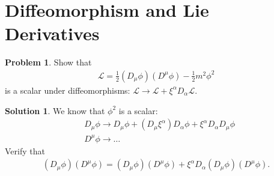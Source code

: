 \documentclass{book}
\numberwithin{equation}{section}
\theoremstyle{definition}
\newtheorem{prob}{Problem}[section]
\newtheorem{sln}{Solution}[section]
\newcommand{\lag}{\mathcal{L}}
\newcommand{\f}[2]{\frac{#1}{#2}}
\begin{document}
\newpage




\section{Diffeomorphism and Lie Derivatives}

\begin{prob}
	Show that
	\begin{align}
	\lag = \f{1}{2}(D_\mu\phi)(D^\mu\phi) - \f{1}{2}m^2\phi^2
	\end{align}
	is a scalar under diffeomorphisms: $\lag \to \lag + \xi^\alpha D_\alpha\lag$. 
	
	\begin{sln}
		We know that $\phi^2$ is a scalar:
		\begin{align}
		&D_\mu\phi \to D_\mu\phi + (D_\mu\xi^\alpha)D_\alpha\phi + \xi^\alpha D_\alpha D_\mu\phi\\
		&D^\mu\phi \to \dots 
		\end{align}
		Verify that
		\begin{align}
		(D_\mu\phi)(D^\mu\phi) = (D_\mu\phi)(D^\mu\phi) + \xi^\alpha D_\alpha(D_\mu\phi)(D^\mu\phi).
		\end{align}
	\end{sln}
	
	
\end{prob}
\end{document}
